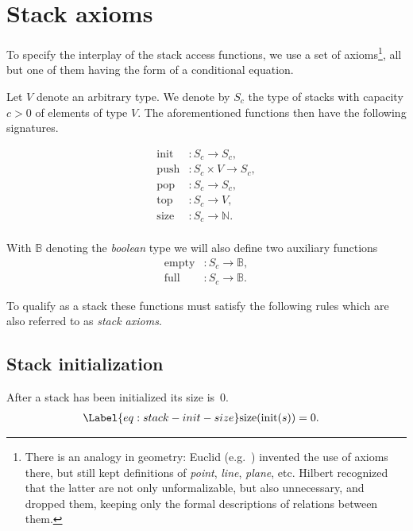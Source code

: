 
\section{Stack axioms}

To specify the interplay of the stack access functions,
we use a set of axioms\footnote{
There is an analogy in geometry:
Euclid (e.g.\ \cite{Fitzpatrick.2008}) invented the use of
axioms there, but still kept definitions of \emph{point},
\emph{line}, \emph{plane}, etc.
Hilbert \cite{Hilbert.1968} recognized that the latter are not
only unformalizable, but also unnecessary, and dropped them,
keeping only the formal descriptions of relations between them.
},
all but one of them having the form of a conditional equation.


Let $V$ denote an arbitrary type.
We denote by $S_c$ the type of stacks with capacity $c > 0$ of
elements of type $V$.
The aforementioned functions then have the following signatures.

\begin{align*}
\mathrm{init} &:  S_c \rightarrow S_c, \\
\mathrm{push} &: S_c\times V \rightarrow S_c, \\
\mathrm{pop} &: S_c \rightarrow S_c,\\
\mathrm{top} &: S_c \rightarrow V, \\
\mathrm{size} &: S_c \rightarrow \mathbb{N}.\\
\end{align*}

With $\mathbb{B}$ denoting the \emph{boolean}
type we will also define two auxiliary functions
\begin{align*}
\mathrm{empty} &: S_c \rightarrow \mathbb{B},\\
\mathrm{full} &: S_c \rightarrow \mathbb{B}.
\end{align*}

To qualify as a stack these functions must satisfy the following rules
which are also referred to as \emph{stack axioms}.

\subsection{Stack initialization}

After a stack has been initialized its size is~0.
\begin{align}
\Label{eq:stack-init-size}
\mathrm{size}(\mathrm{init}(s)) &= 0.
\end{align}


